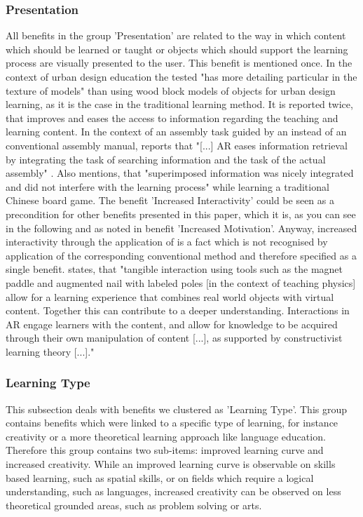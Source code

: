 \subsubsection{Presentation}
All benefits in the group 'Presentation' are related to the way in which content which should be learned or taught or objects which should support the learning process are visually presented to the user.  
This benefit is mentioned once. In the context of urban design education the tested \AR "has more detailing particular in the texture of models"\autocite[17]{Chen.2008} than using wood block models of objects for urban 
design learning, as it is the case in the traditional learning method.
It is reported twice, that \AR \apps improves and eases the access to information regarding the teaching and learning content. In the context of an assembly task guided by an \AR \app instead of an conventional 
assembly manual, \cite{Hou.2013} reports that "[...] AR eases information retrieval by integrating the task of searching information and the task of the actual assembly" \autocite[447]{Hou.2013}. Also \cite{Iwata.2011}
mentions, that "superimposed information was nicely integrated and did not interfere with the learning process"\autocite[112]{Iwata.2011} while learning a traditional Chinese board game.
The benefit 'Increased Interactivity' could be seen as a precondition for other benefits presented in this paper, which it is, as you can see in the following and as noted in benefit 'Increased Motivation'. Anyway, increased interactivity through the application of \AR is a 
fact which is not recognised by application of the corresponding conventional method\autocite[113]{Dunser.2012}\mulcit\autocite[11]{Ibanez.2014} and therefore specified as a single benefit.
\cite{Dunser.2012} states, that "tangible interaction using tools such as the magnet paddle and augmented nail with labeled poles [in the context of teaching physics] allow for a learning experience that combines real world objects with virtual content. 
Together this can contribute to a deeper understanding. Interactions in AR engage learners with the content, and allow for knowledge to be acquired through their own manipulation of content [...], 
as supported by constructivist learning theory [...]."

% 
\subsubsection{Learning Type}
This subsection deals with benefits we clustered as 'Learning Type'. This group contains benefits which were linked to a specific type of learning, for instance creativity or a more theoretical learning approach like language education. \\
Therefore this group contains two sub-items: improved learning curve and increased creativity. While an improved learning curve is observable on skills based learning, such as spatial skills, or on fields which require a logical understanding, such as languages, increased creativity can be observed on less theoretical grounded areas, such as problem solving or arts.

